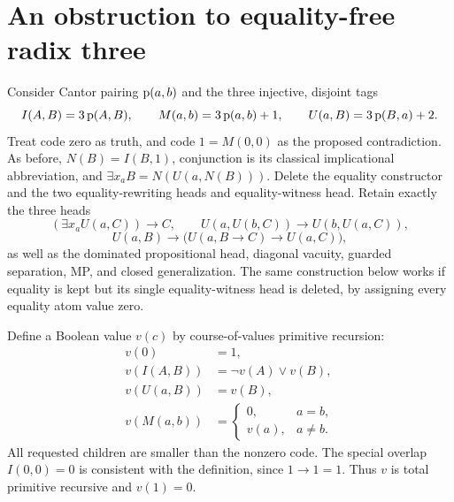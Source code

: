 \section{An obstruction to equality-free radix three}

Consider Cantor pairing $\operatorname{p}(a,b)$ and the three injective, disjoint tags
\[
 I(A,B)=3\operatorname{p}(A,B),\qquad
 M(a,b)=3\operatorname{p}(a,b)+1,\qquad
 U(a,B)=3\operatorname{p}(B,a)+2.
\]
Treat code zero as truth, and code $1=M(0,0)$ as the proposed contradiction.
As before, $N(B)=I(B,1)$, conjunction is its classical implicational
abbreviation, and $\exists x_a B=N(U(a,N(B)))$.
Delete the equality constructor and the two equality-rewriting heads and
equality-witness head. Retain exactly the three heads
\[
 (\exists x_a U(a,C))\to C,\qquad
 U(a,U(b,C))\to U(b,U(a,C)),
\]
\[
 U(a,B)\to\bigl(U(a,B\to C)\to U(a,C)\bigr),
\]
as well as the dominated
propositional head, diagonal vacuity, guarded separation, MP, and closed
generalization. The same construction below works if equality is kept but
its single equality-witness head is deleted, by assigning every equality
atom value zero.

Define a Boolean value $v(c)$ by course-of-values primitive recursion:
\begin{align*}
 v(0)&=1,\\
 v(I(A,B))&=\neg v(A)\lor v(B),\\
 v(U(a,B))&=v(B),\\
 v(M(a,b))&=
   \begin{cases}0,&a=b,\\v(a),&a\ne b.\end{cases}
\end{align*}
All requested children are smaller than the nonzero code. The special
overlap $I(0,0)=0$ is consistent with the definition, since $1\to1=1$.
Thus $v$ is total primitive recursive and $v(1)=0$.

